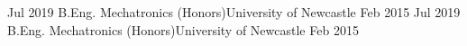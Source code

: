 %
%
%

 \begin{education}
	\school
		{Jul 2019}	{B.Eng. Mechatronics (Honors)}{University of Newcastle}
		{Feb 2015}
	\emptySeparator
	\school
	{Jul 2019}	{B.Eng. Mechatronics (Honors)}{University of Newcastle}
	{Feb 2015}
 \end{education}